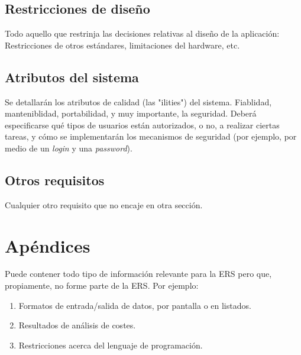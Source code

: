\documentclass[12pt,a4paper]{article}
\begin{document}
\subsection{Restricciones de diseño}
\label{sec:design_constraints}


Todo aquello que restrinja las decisiones relativas al diseño de la
aplicación: Restricciones de otros estándares, limitaciones del
hardware, etc.


\subsection{Atributos del sistema}
\label{sec:system_attributes}

Se detallarán los atributos de calidad (las "ilities") del
sistema. Fiablidad, manteniblidad, portabilidad, y muy importante,
la seguridad. Deberá especificarse qué tipos de usuarios están
autorizados, o no, a realizar ciertas tareas, y cómo se
implementarán los mecanismos de seguridad (por ejemplo, por medio de
un \emph{login} y una \emph{password}).


\subsection{Otros requisitos}
\label{sec:other_requirements}

Cualquier otro requisito que no encaje en otra sección.

\newpage


\section{Apéndices}
\label{sec:appendix}

Puede contener todo tipo de información relevante para la ERS pero
que, propiamente, no forme parte de la ERS. Por ejemplo:

\begin{enumerate}
\item Formatos de entrada/salida de datos, por pantalla o en listados.

\item Resultados de análisis de costes.

\item Restricciones acerca del lenguaje de programación.
\end{enumerate}
\end{document}
